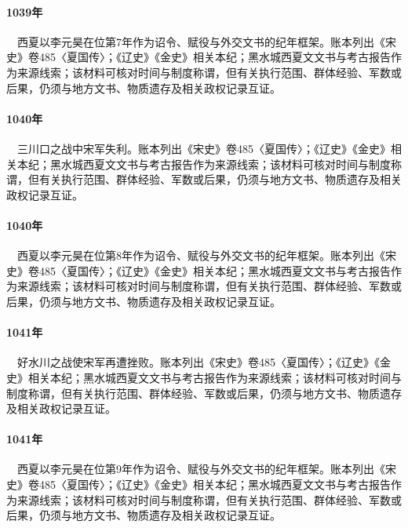 \paragraph{1039年}　西夏以李元昊在位第7年作为诏令、赋役与外交文书的纪年框架。账本列出《宋史》卷485〈夏国传〉；《辽史》《金史》相关本纪；黑水城西夏文文书与考古报告作为来源线索；该材料可核对时间与制度称谓，但有关执行范围、群体经验、军数或后果，仍须与地方文书、物质遗存及相关政权记录互证。

\paragraph{1040年}　三川口之战中宋军失利。账本列出《宋史》卷485〈夏国传〉；《辽史》《金史》相关本纪；黑水城西夏文文书与考古报告作为来源线索；该材料可核对时间与制度称谓，但有关执行范围、群体经验、军数或后果，仍须与地方文书、物质遗存及相关政权记录互证。

\paragraph{1040年}　西夏以李元昊在位第8年作为诏令、赋役与外交文书的纪年框架。账本列出《宋史》卷485〈夏国传〉；《辽史》《金史》相关本纪；黑水城西夏文文书与考古报告作为来源线索；该材料可核对时间与制度称谓，但有关执行范围、群体经验、军数或后果，仍须与地方文书、物质遗存及相关政权记录互证。

\paragraph{1041年}　好水川之战使宋军再遭挫败。账本列出《宋史》卷485〈夏国传〉；《辽史》《金史》相关本纪；黑水城西夏文文书与考古报告作为来源线索；该材料可核对时间与制度称谓，但有关执行范围、群体经验、军数或后果，仍须与地方文书、物质遗存及相关政权记录互证。

\paragraph{1041年}　西夏以李元昊在位第9年作为诏令、赋役与外交文书的纪年框架。账本列出《宋史》卷485〈夏国传〉；《辽史》《金史》相关本纪；黑水城西夏文文书与考古报告作为来源线索；该材料可核对时间与制度称谓，但有关执行范围、群体经验、军数或后果，仍须与地方文书、物质遗存及相关政权记录互证。

